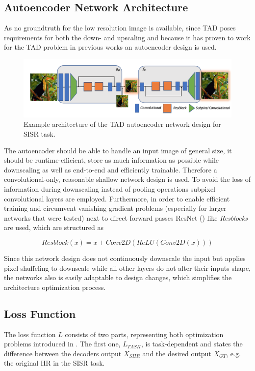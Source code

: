 \subsection{Autoencoder Network Architecture}
\label{sec:Approach_ANA}
As no groundtruth for the low resolution image is available, since \ac{TAD}
poses requirements for both the down- and upscaling and because it has proven
to work for the \ac{TAD} problem in previous works an autoencoder design
is used.

\begin{figure}[!htbp]
	\centering
	\includegraphics[width=14cm]{figures/architecture}
	\caption{Example architecture of the \ac{TAD} autoencoder network
  design for \ac{SISR} task.}
  \label{fig:architecture}
\end{figure}

The autoencoder should be able to handle an input image of general size, it
should be runtime-efficient, store as much information as possible while
downscaling as well as end-to-end and efficiently trainable.
Therefore a convolutional-only, reasonable shallow network design is used. To
avoid the loss of information during downscaling instead of pooling operations
subpixel convolutional layers are employed. Furthermore, in order to enable
efficient training and circumvent vanishing gradient problems (especially for
larger networks that were tested) next to direct forward passes ResNet
(\cite{DRLFIR}) like \textit{Resblocks} are used, which are structured as

$$Resblock(x) = x + Conv2D(ReLU(Conv2D(x)))$$

Since this network design does not continuously downscale the input but
applies pixel shuffeling to downscale while all other layers do not alter their
inputs shape, the networks also is easily adaptable to design changes, which
simplifies the architecture optimization process.

\subsection{Loss Function}
\label{sec:Approach_LF}
The loss function $L$ consists of two parts, representing both optimization
problems introduced in . The first one, $L_{TASK}$, is
task-dependent and states the difference between the decoders output $X_{SHR}$
and the desired output $X_{GT}$, e.g. the original \ac{HR} in the \ac{SISR} task.

